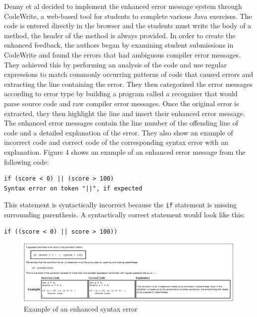 \documentclass{sig-alternate}
\begin{document}
Denny et al decided to implement the enhanced error message system through CodeWrite, a web-based tool for students to complete various Java exercises.
The code is entered directly in the browser and the students must write the body of a method, the header of the method is always provided.
In order to create the enhanced feedback, the authors began by examining student submissions in CodeWrite and found the errors that had ambiguous compiler error messages. 
They achieved this by performing an analysis of the code and use regular expressions to match commonly occurring patterns of code that caused errors and  extracting the line containing the error.
They then categorized the error messages according to error type by building a program called a recognizer that would parse source code and raw compiler error messages.
Once the original error is extracted, they then highlight the line and insert their enhanced error message.
The enhanced error messages contain the line number of the offending line of code and a detailed explanation of the error.
They also show an example of incorrect code and correct code of the corresponding syntax error with an explanation.
Figure 4 shows an example of an enhanced error message from the following code:~\cite{Denny:2014:ESE:2591708.2591748}

\begin{verbatim}
if (score < 0) || (score > 100)
Syntax error on token "||", if expected
\end{verbatim}

This statement is syntactically incorrect because the \texttt{if} statement is missing surrounding parenthesis. A syntactically correct statement would look like this:

\begin{verbatim}
if ((score < 0) || score > 100))
\end{verbatim}

\begin{figure}
  \centering
  \includegraphics[keepaspectratio, width=\textwidth]{ESE_example.png}
  \caption{Example of an enhanced syntax error}
  \label{fig:drracketstudy}
\end{figure}
\end{document}

